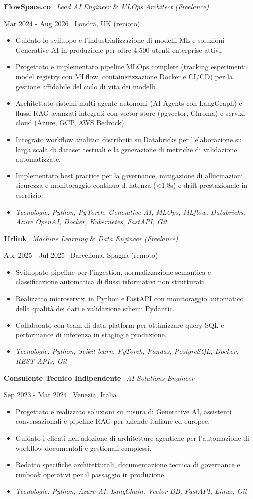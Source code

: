 \documentclass[a4paper,10pt]{article}
\newcommand{\role}[4]{%
  \vspace{2pt}\noindent
  \begin{minipage}[t]{0.70\textwidth}\raggedright\textbf{#1} \textbullet\ \textit{#3}\end{minipage}%
  \hfill
  \begin{minipage}[t]{0.28\textwidth}\raggedleft\footnotesize\color{gray}#2 \textbullet\ #4\end{minipage}%
  \vspace{1pt}%
}
\begin{document}
\role{\href{https://flowspace.co}{FlowSpace.co}}{Mar 2024 - Aug 2026}{Lead AI Engineer $\&$ MLOps Architect (Freelance)}{Londra, UK (remoto)}
\begin{itemize}
  \item Guidato lo sviluppo e l'industrializzazione di modelli ML e soluzioni Generative AI in produzione per oltre 4.500 utenti enterprise attivi.
  \item Progettato e implementato pipeline MLOps complete (tracking esperimenti, model registry con MLflow, containerizzazione Docker e CI/CD) per la gestione affidabile del ciclo di vita dei modelli.
  \item Architettato sistemi multi-agente autonomi (AI Agents con LangGraph) e flussi RAG avanzati integrati con vector store (pgvector, Chroma) e servizi cloud (Azure, GCP, AWS Bedrock).
  \item Integrato workflow analitici distribuiti su Databricks per l'elaborazione su larga scala di dataset testuali e la generazione di metriche di validazione automatizzate.
  \item Implementato best practice per la governance, mitigazione di allucinazioni, sicurezza e monitoraggio continuo di latenza (<1.8s) e drift prestazionale in esercizio.
  \item \textit{Tecnologie: Python, PyTorch, Generative AI, MLOps, MLflow, Databricks, Azure OpenAI, Docker, Kubernetes, FastAPI, Git}
\end{itemize}

\role{Urlink}{Apr 2025 - Jul 2025}{Machine Learning $\&$ Data Engineer (Freelance)}{Barcellona, Spagna (remoto)}
\begin{itemize}
  \item Sviluppato pipeline per l'ingestion, normalizzazione semantica e classificazione automatica di flussi informativi non strutturati.
  \item Realizzato microservizi in Python e FastAPI con monitoraggio automatico della qualità dei dati e validazione schemi Pydantic.
  \item Collaborato con team di data platform per ottimizzare query SQL e performance di inferenza in staging e produzione.
  \item \textit{Tecnologie: Python, Scikit-learn, PyTorch, Pandas, PostgreSQL, Docker, REST APIs, Git}
\end{itemize}

\role{Consulente Tecnico Indipendente}{Sep 2023 - Mar 2024}{AI Solutions Engineer}{Venezia, Italia}
\begin{itemize}
  \item Progettato e realizzato soluzioni su misura di Generative AI, assistenti conversazionali e pipeline RAG per aziende italiane ed europee.
  \item Guidato i clienti nell'adozione di architetture agentiche per l'automazione di workflow documentali e gestionali complessi.
  \item Redatto specifiche architetturali, documentazione tecnica di governance e runbook operativi per il passaggio in produzione.
  \item \textit{Tecnologie: Python, Azure AI, LangChain, Vector DB, FastAPI, Linux, Git}
\end{itemize}
\end{document}
